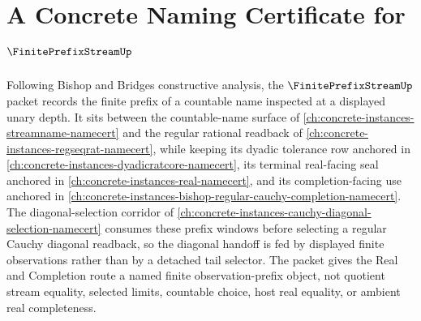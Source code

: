 \chapter{A Concrete Naming Certificate for $\FinitePrefixStreamUp$}
\label{ch:concrete-instances-finite-prefix-stream-certificate-namecert}

Following Bishop and Bridges constructive analysis, the $\FinitePrefixStreamUp$ packet records the finite prefix of a countable name inspected at a displayed unary depth. It sits between the countable-name surface of \autoref{ch:concrete-instances-streamname-namecert} and the regular rational readback of \autoref{ch:concrete-instances-regseqrat-namecert}, while keeping its dyadic tolerance row anchored in \autoref{ch:concrete-instances-dyadicratcore-namecert}, its terminal real-facing seal anchored in \autoref{ch:concrete-instances-real-namecert}, and its completion-facing use anchored in \autoref{ch:concrete-instances-bishop-regular-cauchy-completion-namecert}. The diagonal-selection corridor of \autoref{ch:concrete-instances-cauchy-diagonal-selection-namecert} consumes these prefix windows before selecting a regular Cauchy diagonal readback, so the diagonal handoff is fed by displayed finite observations rather than by a detached tail selector. The packet gives the Real and Completion route a named finite observation-prefix object, not quotient stream equality, selected limits, countable choice, host real equality, or ambient real completeness.

